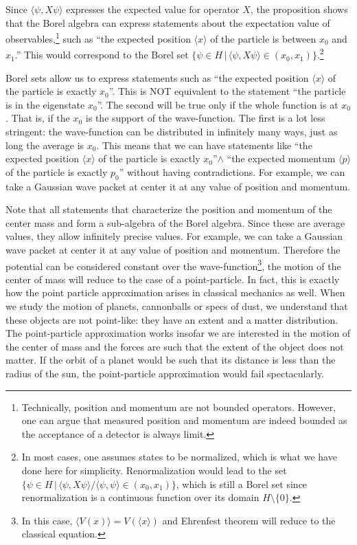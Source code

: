 \documentclass[10pt,twocolumn, nofootinbib]{revtex4-1}
\begin{document}
Since $\langle \psi , X \psi \rangle$ expresses the expected value for operator $X$, the proposition shows that the Borel algebra can express statements about the expectation value of observables,\footnote{Technically, position and momentum are not bounded operators. However, one can argue that measured position and momentum are indeed bounded as the acceptance of a detector is always limit.} such as ``the expected position $\langle x \rangle$ of the particle is between $x_0$ and $x_1$.'' This would correspond to the Borel set $\{ \psi \in H \, | \, \langle \psi , X \psi \rangle \in (x_0, x_1) \}$.\footnote{In most cases, one assumes states to be normalized, which is what we have done here for simplicity. Renormalization would lead to the set $\{ \psi \in H \, | \, \langle \psi , X \psi \rangle / \langle \psi , \psi \rangle \in (x_0, x_1) \}$, which is still a Borel set since renormalization is a continuous function over its domain $H \setminus \{ 0 \}$.}

Borel sets allow us to express statements such as ``the expected position $\langle x \rangle$ of the particle is exactly $x_0$''. This is NOT equivalent to the statement ``the particle is in the eigenstate $x_0$''. The second will be true only if the whole function is at $x_0$. That is, if the $x_0$ is the support of the wave-function. The first is a lot less stringent: the wave-function can be distributed in infinitely many ways, just as long the average is $x_0$. This means that we can have statements like ``the expected position $\langle x \rangle$ of the particle is exactly $x_0$''$\wedge$ ``the expected momentum $\langle p \rangle$ of the particle is exactly $p_0$'' without having contradictions. For example, we can take a Gaussian wave packet at center it at any value of position and momentum.

Note that all statements that characterize the position and momentum of the center mass and form a sub-algebra of the Borel algebra. Since these are average values, they allow infinitely precise values. For example, we can take a Gaussian wave packet at center it at any value of position and momentum. Therefore the potential can be considered constant over the wave-function\footnote{In this case, $\langle V(x) \rangle = V(\langle x \rangle)$ and Ehrenfest theorem will reduce to the classical equation.}, the motion of the center of mass will reduce to the case of a point-particle. In fact, this is exactly how the point particle approximation arises in classical mechanics as well. When we study the motion of planets, cannonballs or specs of dust, we understand that these objects are not point-like: they have an extent and a matter distribution. The point-particle approximation works insofar we are interested in the motion of the center of mass and the forces are such that the extent of the object does not matter. If the orbit of a planet would be such that its distance is less than the radius of the sun, the point-particle approximation would fail spectacularly.
\end{document}
